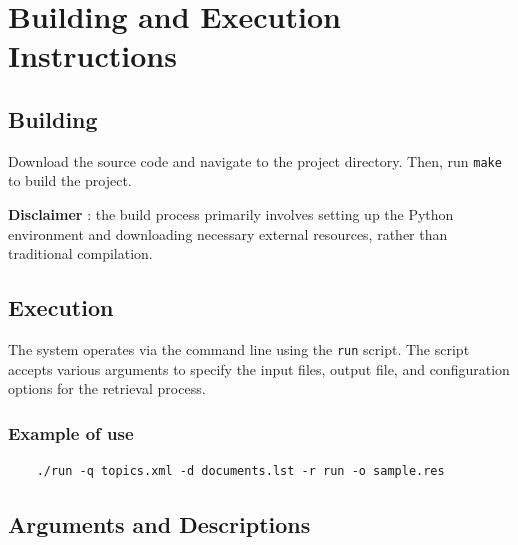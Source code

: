 \documentclass[a4paper, 12pt]{article}
\begin{document}
\section{Building and Execution Instructions}

\subsection{Building}

Download the source code and navigate to the project directory.
Then, run \texttt{make} to build the project.

\textbf{Disclaimer} : the build process primarily involves setting up the Python environment and downloading necessary external resources, rather than traditional compilation.

\subsection{Execution}
The system operates via the command line using the \texttt{run} script.
The script accepts various arguments to specify the input files, output file, and configuration options for the retrieval process.

\subsubsection{Example of use}
\begin{verbatim}
    ./run -q topics.xml -d documents.lst -r run -o sample.res
\end{verbatim}

\newpage 
\subsection{Arguments and Descriptions}
\end{document}
